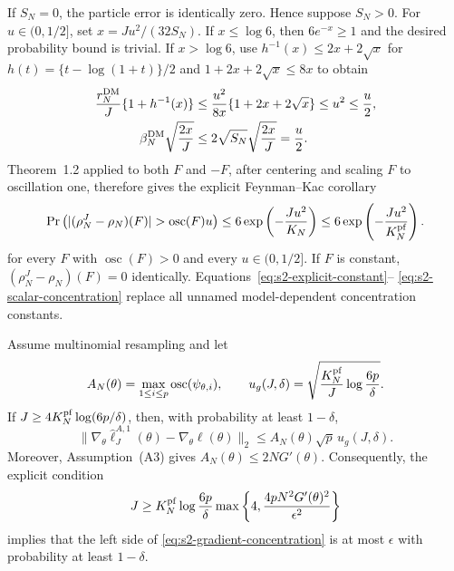 \documentclass[11pt]{article}
\newcommand\refAssumpBoundedMeasurement{(A3)} %
\theoremstyle{thmstylethree}%
\begin{document}
If $S_N=0$, the particle error is identically zero.  Hence suppose $S_N>0$.
For $u\in(0,1/2]$, set $x=Ju^2/(32S_N)$.  If $x\leq\log6$, then
$6e^{-x}\geq1$ and the desired probability bound is trivial.  If
$x>\log6$, use
$h^{-1}(x)\leq2x+2\sqrt x$ for
$h(t)=\{t-\log(1+t)\}/2$ and
$1+2x+2\sqrt x\leq8x$ to obtain
\begin{align*}
\frac{r_N^{\rm DM}}J\{1+h^{-1}(x)\}
&\leq\frac{u^2}{8x}\{1+2x+2\sqrt x\}
 \leq u^2\leq\frac u2,\\
\beta_N^{\rm DM}\sqrt{\frac{2x}{J}}
&\leq2\sqrt{S_N}\sqrt{\frac{2x}{J}}=\frac u2.
\end{align*}
Theorem~1.2 applied to both $F$ and $-F$, after centering and scaling $F$ to
oscillation one, therefore gives the explicit Feynman--Kac corollary
\begin{equation}
\Pr\left(
 |(\rho_N^J-\rho_N)(F)|>\operatorname{osc}(F)u
 \right)
\leq6\exp\left(-\frac{Ju^2}{K_N}\right)
\leq6\exp\left(-\frac{Ju^2}{K_N^{\rm pf}}\right).             \label{eq:s2-scalar-concentration}
\end{equation}
for every $F$ with $\operatorname{osc}(F)>0$ and every $u\in(0,1/2]$.
If $F$ is constant, $(\rho_N^J-\rho_N)(F)=0$ identically.
Equations~\ref{eq:s2-explicit-constant}--
\ref{eq:s2-scalar-concentration} replace all unnamed model-dependent
concentration constants.

\begin{lem}
\label{lemma:grad_bound}
Assume multinomial resampling and let
\begin{equation}
A_N(\theta)=\max_{1\leq i\leq p}
 \operatorname{osc}(\psi_{\theta,i}),
\qquad
u_g(J,\delta)=
 \sqrt{\frac{K_N^{\rm pf}}{J}\log\frac{6p}{\delta}}.
\label{eq:s2-gradient-constants}
\end{equation}
If $J\geq4K_N^{\rm pf}\log(6p/\delta)$, then, with probability at least
$1-\delta$,
\begin{equation}
\|\nabla_\theta\hat\ell_J^{A,1}(\theta)
      -\nabla_\theta\ell(\theta)\|_2
\leq A_N(\theta)\sqrt p\,u_g(J,\delta).                        \label{eq:s2-gradient-concentration}
\end{equation}
Moreover, Assumption~{\refAssumpBoundedMeasurement} gives
$A_N(\theta)\leq2NG'(\theta)$.  Consequently, the explicit condition
\begin{equation}
J\geq K_N^{\rm pf}\log\frac{6p}{\delta}
 \max\left\{4,\frac{4pN^2G'(\theta)^2}{\epsilon^2}\right\}     \label{eq:s2-gradient-particle-count}
\end{equation}
implies that the left side of \eqref{eq:s2-gradient-concentration} is at most
$\epsilon$ with probability at least $1-\delta$.
\end{lem}
\end{document}
